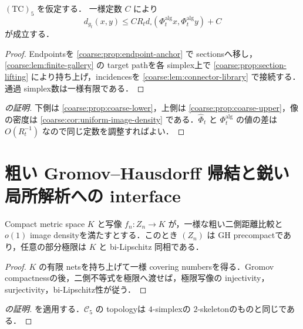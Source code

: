 \documentclass[a4paper,11pt]{ltjsarticle}
\numberwithin{equation}{section}
\theoremstyle{plain}
\theoremstyle{definition}
\theoremstyle{remark}
\newcommand{\Cfive}{\mathcal C_5}\newcommand{\dsq}{d_{\square}}\newcommand{\Lt}{L_t}\newcommand{\Rt}{R_t}
\begin{document}
\begin{proposition}[粗い距離上界]\label{coarse:prop:coarse-upper}
$\mathrm{(TC)}_5$ を仮定する．
一様定数 $C$ により
\begin{equation}\label{coarse:eq:coarse-upper}
 d_{g_t}(x,y)
 \le CR_t d_\square(\Phi_t^{\mathrm{alg}}x,\Phi_t^{\mathrm{alg}}y)+C
\end{equation}
が成立する．
\end{proposition}

\begin{proof}
Endpointsを \cref{coarse:prop:endpoint-anchor} で sectionsへ移し，\cref{coarse:lem:finite-gallery} の target pathを各 simplex上で \cref{coarse:prop:section-lifting} により持ち上げ，incidencesを \cref{coarse:lem:connector-library} で接続する．通過 simplex数は一様有限である．
\end{proof}

\begin{proof}[ の証明]
下側は \cref{coarse:prop:coarse-lower}，上側は \cref{coarse:prop:coarse-upper}，像の密度は \cref{coarse:cor:uniform-image-density} である．$\widehat\Phi_t$ と $\Phi_t^{\mathrm{alg}}$ の値の差は $O(R_t^{-1})$ なので同じ定数を調整すればよい．
\end{proof}

\section{粗い Gromov--Hausdorff 帰結と鋭い局所解析への interface}\label{coarse:sec:interface}

\begin{lemma}\label{coarse:lem:coarse-compactness}
Compact metric space $K$ と写像 $f_n:Z_n\to K$ が，一様な粗い二側距離比較と $o(1)$ image densityを満たすとする．このとき $(Z_n)$ は GH precompactであり，任意の部分極限は $K$ と bi-Lipschitz 同相である．
\end{lemma}

\begin{proof}
$K$ の有限 netsを持ち上げて一様 covering numbersを得る．Gromov compactnessの後，二側不等式を極限へ渡せば，極限写像の injectivity，surjectivity，bi-Lipschitz性が従う．
\end{proof}

\begin{proof}[ の証明]
 を適用する．$\Cfive$ の topologyは $4$-simplexの $2$-skeletonのものと同じである．
\end{proof}
\end{document}
